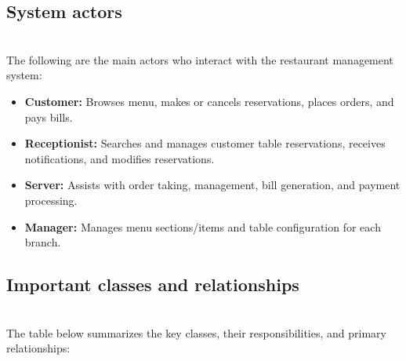 \subsection{System actors}\label{xeVungaihModcaoY3JbvF}
\\
The following are the main actors who interact with the restaurant management system:

\begin{itemize}
\item
\protect{}\label{e7zhrYlfpMaY4eY9QgCum}
\textbf{Customer:} Browses menu, makes or cancels reservations, places orders, and pays bills.
\item
\protect{}\label{gX0nU0pUfp3OVpTpLzdkF}
\textbf{Receptionist:} Searches and manages customer table reservations, receives notifications, and modifies reservations.
\item
\protect{}\label{6GoE7TJ-sO7RjbjyB6tQd}
\textbf{Server:} Assists with order taking, management, bill generation, and payment processing.
\item
\protect{}\label{tu9TIgGAW9F31jkSa5yU8}
\textbf{Manager:} Manages menu sections/items and table configuration for each branch.
\end{itemize}

\subsection{Important classes and relationships}\label{q9z7jHLrtV25jBOEYF3xy}
\\
The table below summarizes the key classes, their responsibilities, and primary relationships:

